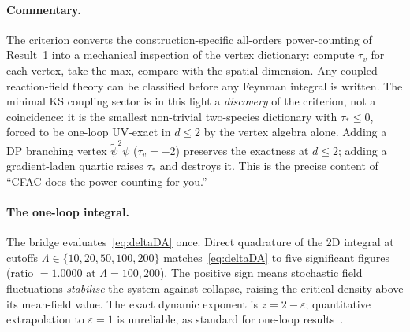 \documentclass[11pt,a4paper]{article}
\newcommand{\psit}{\tilde\psi}
\theoremstyle{plain}
\begin{document}
\paragraph{Commentary.}
The criterion converts the construction-specific all-orders
power-counting of Result~1 into a mechanical inspection of the
vertex dictionary: compute $\tau_v$ for each vertex, take the
max, compare with the spatial dimension.  Any coupled
reaction-field theory can be classified before any Feynman
integral is written.  The minimal KS coupling sector is in this
light a \emph{discovery} of the criterion, not a coincidence: it
is the smallest non-trivial two-species dictionary with
$\tau_\ast \leq 0$, forced to be one-loop UV-exact in $d \leq 2$
by the vertex algebra alone.  Adding a DP branching vertex
$\psit^2\psi$ ($\tau_v = -2$) preserves the exactness at $d\leq 2$;
adding a gradient-laden quartic raises $\tau_\ast$ and destroys
it.  This is the precise content of ``CFAC does the power
counting for you.''

\paragraph{The one-loop integral.}
The bridge evaluates~\eqref{eq:deltaDA} once.  Direct quadrature
of the 2D integral at cutoffs
$\Lambda \in \{10, 20, 50, 100, 200\}$ matches~\eqref{eq:deltaDA}
to five significant figures (ratio $=1.0000$ at $\Lambda = 100,
200$).  The positive sign means stochastic field fluctuations
\emph{stabilise} the system against collapse, raising the
critical density above its mean-field value.  The exact dynamic
exponent is $z = 2 - \varepsilon$; quantitative extrapolation to
$\varepsilon = 1$ is unreliable, as standard for one-loop
results~\cite{Tauber}.
\end{document}
